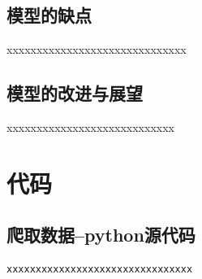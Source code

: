 \documentclass{whutmod}
\begin{document}
	\subsection{模型的缺点}
xxxxxxxxxxxxxxxxxxxxxxxxxxxxxx


	\subsection{模型的改进与展望}%
xxxxxxxxxxxxxxxxxxxxxxxxxxxx
	\newpage	%
	\nocite{*}		%
	\printbibliography[title = {参考文献}]	%
	
	\newpage
	\appendix %
\section{代码}
\subsection{爬取数据--python源代码}
\begin{lstlisting}[language=python]%这里修改语言
xxxxxxxxxxxxxxxxxxxxxxxxxxxxxxxx
\end{lstlisting}
\end{document}

